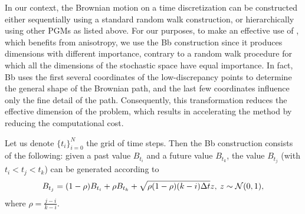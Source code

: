 In our context, the Brownian motion on a time discretization  can be constructed either sequentially using a standard random walk construction, or hierarchically using   other PGMs as listed above. For our purposes, to make an effective use of  , which benefits from anisotropy, we use the Bb construction since it produces  dimensions with different importance, contrary to a random walk procedure for which all the dimensions of the stochastic space have equal importance. In fact, Bb uses the first several coordinates of the low-discrepancy points to determine the general shape of the Brownian path, and the last few coordinates influence only the fine detail of the path. Consequently, this transformation  reduces the effective dimension  of the problem, which results in accelerating the  method by reducing the computational cost.

Let us denote $\{t_i\}_{i=0}^{N}$ the grid of time steps. Then the Bb construction \cite{glasserman2004monte} consists of the following: given a past value $B_{t_i}$ and a future value $B_{t_k}$, the value $B_{t_j}$ (with $t_i < t_j < t_k$) can be generated according to 
\begin{equation*}
B_{t_j}=(1-\rho) B_{t_i}+\rho B_{t_k}+ \sqrt{\rho (1-\rho)(k-i) \Delta t} z, \: z \sim \mathcal{N}(0,1) ,
\end{equation*}
where $\rho=\frac{j-i}{k-i}$.  





%


